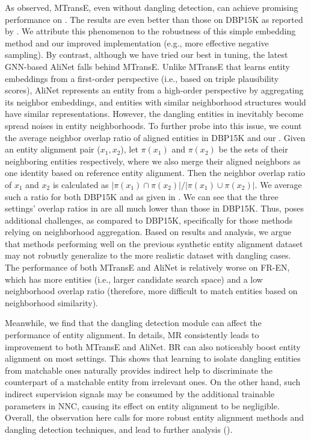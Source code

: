 As observed,
MTransE, even without dangling detection, can achieve promising performance on \dataset. 
The results are even better than those on DBP15K as reported by \citet{JAPE}.
We attribute this phenomenon to the robustness of this simple embedding method and our improved implementation (e.g., more effective negative sampling).
By contrast, although we have tried our best in tuning, the latest GNN-based AliNet falls behind MTransE.
Unlike MTransE that learns entity embeddings from a first-order perspective (i.e., based on triple plausibility scores), AliNet represents an entity from a high-order perspective by aggregating its neighbor embeddings, and entities with similar neighborhood structures would have similar representations.
However, the dangling entities in \dataset inevitably become spread noises in entity neighborhoods.
To further probe into this issue, we count the average neighbor overlap ratio of aligned entities in DBP15K and our \dataset. Given an entity alignment pair ($x_1,x_2$), let $\pi(x_1)$ and $\pi(x_2)$ be the sets of their neighboring entities
respectively, where we also merge their aligned neighbors as one identity based on reference entity alignment. 
Then the neighbor overlap ratio of $x_1$ and $x_2$ is calculated as $|\pi(x_1)\cap \pi(x_2)|/|\pi(x_1)\cup \pi(x_2)|$. 
We average such a ratio for both DBP15K and \dataset as given in .
We can see that the three settings' overlap ratios in \dataset are all much lower than those in DBP15K.
Thus, \dataset poses additional challenges, as compared to DBP15K, specifically for those methods relying on neighborhood aggregation.
Based on results and analysis, we argue that methods performing well on the previous synthetic entity alignment dataset may not robustly generalize to the more realistic dataset with dangling cases.
The performance of both MTransE and AliNet is relatively worse on FR-EN, 
which has more entities (i.e., larger candidate search space) and a low neighborhood overlap ratio (therefore, more difficult to match entities based on neighborhood similarity).

Meanwhile,
we find that the dangling detection module can affect the performance of entity alignment.
In details, MR consistently leads to  improvement to both MTransE and AliNet. 
BR can also noticeably boost entity alignment on most settings.
This shows that learning to isolate dangling entities from matchable ones naturally provides indirect help to discriminate the counterpart of a matchable entity from irrelevant ones.
On the other hand, such indirect supervision signals may be consumed by the additional trainable parameters in NNC, causing its effect on entity alignment to be negligible. 
Overall, the observation here calls for more robust entity alignment methods and dangling detection techniques, and lead to further analysis ().


